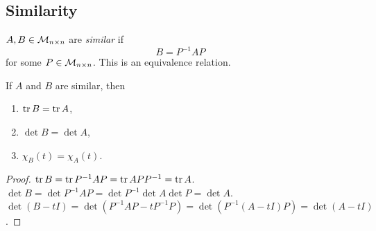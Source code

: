 \documentclass[10pt]{article}
\begin{document}
    \subsection{Similarity}
    \begin{definition}
        $ A,B\in {\mathcal{M}}_{n\times n} $ are \textit{similar} if 
        \[
            B=P^{-1}AP
        \]
        for some $ P\in {\mathcal{M}}_{n \times n} $. This is an equivalence relation.
    \end{definition}
    \begin{proposition}
        If $A$ and $B$ are similar, then 
        \begin{enumerate}
            \item $ \tr B=\tr A $,
            \item $ \det B=\det A $,
            \item $ \chi_B(t)=\chi_A(t) $.
        \end{enumerate}
    \end{proposition}
    \begin{proof}
        $ \tr B=\tr P^{-1}AP=\tr APP^{-1}=\tr A $. \\
        $ \det B=\det P^{-1}AP=\det P^{-1}\det A \det P=\det A $. \\
        $ \det (B-tI)=\det (P^{-1}AP-tP^{-1}P)=\det (P^{-1}(A-tI)P)=\det (A-tI) $.
    \end{proof}
\end{document}
